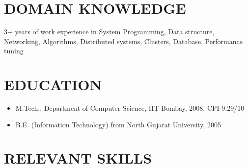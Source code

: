 \documentclass{res}
\begin{document}
\thispagestyle{empty} %

\address{ \\ \\ \\}

\address{  \\ chandarana [at] gmail.com \\ +91-9379228622\\  +91-8861847294 \\ }

\begin{resume}

					 \section{DOMAIN KNOWLEDGE}

					 3+ years of work experience in System Programming, Data structure, Networking, Algorithms, Distributed systems, Clusters, Database, Performance tuning

					  \section{EDUCATION}
					  \begin{itemize}
					  \item M.Tech., Department of Computer Science, IIT Bombay, 2008. CPI 9.29/10
					  \item B.E. (Information Technology) from North Gujarat University, 2005
					  \end{itemize}

					  \section{RELEVANT SKILLS}


\end{resume}
\end{document}

